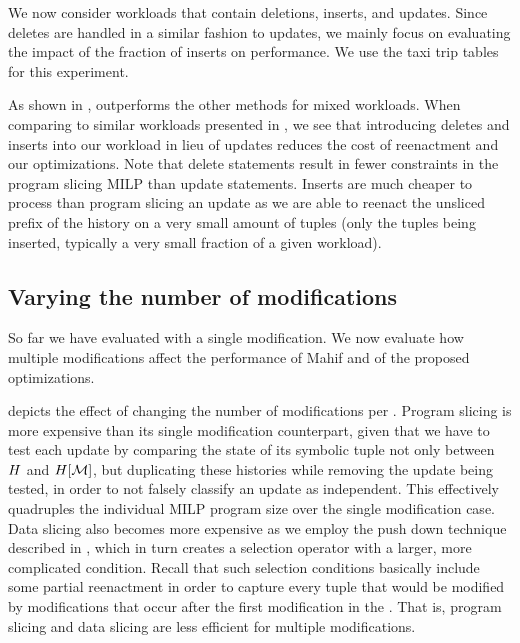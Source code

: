 We now consider workloads that contain deletions, inserts, and updates. Since deletes are handled in a similar fashion to updates, we mainly focus on evaluating the impact of the fraction of inserts on performance. We use the taxi trip tables for this experiment. %

As shown in , \mrdp outperforms the other methods for mixed workloads. When comparing to similar workloads presented in , we see that introducing deletes and inserts into our workload in lieu of updates reduces the cost of reenactment and our optimizations. Note that delete statements result in fewer constraints in the program slicing MILP than update statements. Inserts are much cheaper to process than program slicing an update as we are able to reenact the unsliced prefix of the history on a very small amount of tuples (only the tuples being inserted, typically a very small fraction of a given workload).

\subsection{Varying the number of modifications}\label{sec:vary-numb-modif}
So far we have evaluated \abbrHWs with a single modification. We now evaluate how multiple modifications affect the performance of Mahif and of the proposed optimizations.

 depicts the effect of changing the number of modifications per \abbrHW. Program slicing is more expensive than its single modification counterpart, given that we have to test each update by comparing the state of its symbolic tuple not only between $H$ and $H[\mathcal{M}]$, but duplicating these histories while removing the update being tested, in order to not falsely classify an update as independent. This effectively quadruples the individual MILP program size over the single modification case. Data slicing also becomes more expensive as we employ the push down technique described in , which in turn creates a selection operator with a  larger, more complicated condition. Recall that such selection conditions basically include some partial reenactment in order to capture every tuple that would be modified by modifications that occur after the first modification in the \abbrHW. That is, program slicing and data slicing are less efficient for multiple modifications.

